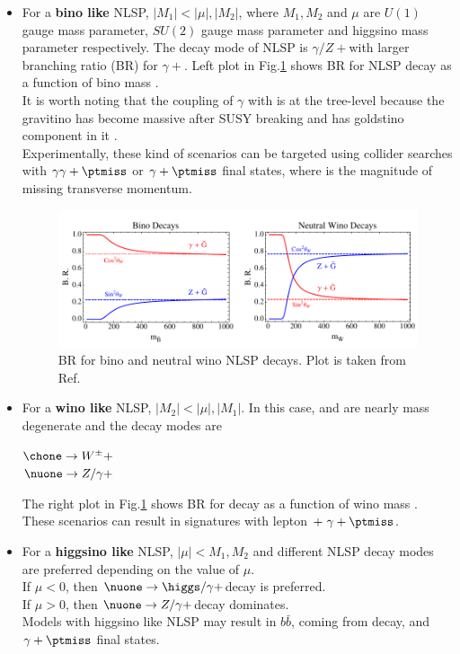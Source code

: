 \begin{itemize}
\item For a \textbf{bino like} NLSP, $|M_1| < |\mu|, |M_2|$, where $M_1, M_2$ and $\mu$ are $U(1)$ gauge mass parameter, $SU(2)$ gauge mass parameter and higgsino mass parameter respectively. The decay mode of NLSP is $\gamma/Z +$\grav with larger branching ratio (BR) for  $\gamma +$\grav. Left plot in Fig.\ref{fig:NLSPwinoBinoBR} shows BR for NLSP decay as a function of bino mass \cite{Ruderman:2011vv}.\\
It is worth noting that the coupling of $\gamma$ with  is at the tree-level because the gravitino has become massive after SUSY breaking and has goldstino component in it \cite{Martin:1997ns}.\\
Experimentally, these kind of scenarios can be targeted using collider searches with $\gamma\gamma+\ptmiss$ or $\gamma+\ptmiss$ final states, where \ptmiss is the magnitude of missing transverse momentum.

\begin{figure}[h!]
\centering
\includegraphics[width=0.8\linewidth]{../Figures/Chap1/NLSPwinoBinoBR}
\caption[BR for bino and neutral wino NLSP decays]{BR for bino and neutral wino NLSP decays. Plot is taken from Ref.\cite{Ruderman:2011vv}}
\label{fig:NLSPwinoBinoBR}
\end{figure}

\item For a \textbf{wino like} NLSP, $|M_2| < |\mu|, |M_1|$. In this case, \nuone and \chone are nearly mass degenerate and the decay modes are
\begin{center}
$\chone \rightarrow W^\pm + $\grav \\%
$\nuone \rightarrow Z/\gamma + $\grav
\end{center}
The right plot in Fig.\ref{fig:NLSPwinoBinoBR} shows BR for \nuone decay as a function of wino mass \cite{Ruderman:2011vv}. These scenarios can result in signatures with lepton $+\ \gamma+\ptmiss$.

\item For a \textbf{higgsino like} NLSP, $|\mu| < M_1,M_2$ and different NLSP decay modes are preferred depending on the value of $\mu$.\\
If $\mu < 0$, then $\nuone \rightarrow \higgs/\gamma + $\grav decay is preferred.\\
If $\mu > 0$, then $\nuone \rightarrow Z/\gamma + $\grav decay dominates.\\
Models with higgsino like NLSP may result in $b\bar{b}$, coming from \higgs decay, and $\gamma+\ptmiss$ final states.
\end{itemize}

